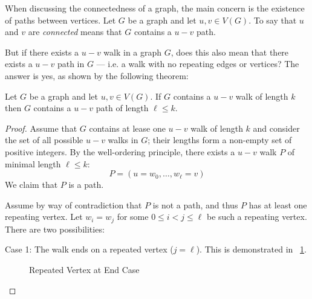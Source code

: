 When discussing the connectedness of a graph, the main concern is the existence of paths between vertices.  Let
\(G\) be a graph and let \(u,v\in V(G)\).  To say that \(u\) and \(v\) are \emph{connected} means that \(G\)
contains a \(u-v\) path.

But if there exists a \(u-v\) walk in a graph \(G\), does this also mean that there exists a \(u-v\) path in \(G\)
--- i.e. a walk with no repeating edges or vertices?  The answer is yes, as shown by the following theorem:

\begin{theorem}
  Let \(G\) be a graph and let \(u,v\in V(G)\).  If \(G\) contains a \(u-v\) walk of length \(k\) then \(G\)
  contains a \(u-v\) path of length \(\ell\le k\).
\end{theorem}

\begin{proof}
  Assume that \(G\) contains at lease one \(u-v\) walk of length \(k\) and consider the set of all possible \(u-v\)
  walks in \(G\); their lengths form a non-empty set of positive integers.  By the well-ordering principle, there
  exists a \(u-v\) walk \(P\) of minimal length \(\ell\le k\):
  \[P=(u=w_0,\ldots,w_{\ell}=v)\]
  We claim that \(P\) is a path.

  Assume by way of contradiction that \(P\) is not a path, and thus \(P\) has at least one repeating vertex.  Let
  \(w_i=w_j\) for some \(0\le i<j\le\ell\) be such a repeating vertex.  There are two possibilities:
  
  \begin{description}
  \item Case 1: The walk ends on a repeated vertex (\(j=\ell\)).  This is demonstrated in
    \figurename~\ref{fig:rend}.

    \begin{figure}[H]
      \label{fig:rend}
      \begin{center}
      \end{center}
      \caption{Repeated Vertex at End Case}
    \end{figure}


\end{description}
\end{proof}
